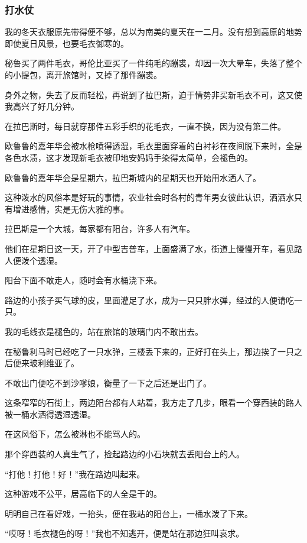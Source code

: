 \subsubsection*{打水仗}
\par 我的冬天衣服原先带得便不够，总以为南美的夏天在一二月。没有想到高原的地势即使夏日风景，也要毛衣御寒的。
\par 秘鲁买了两件毛衣，哥伦比亚买了一件纯毛的蹦裘，却因一次大晕车，失落了整个的小提包，离开旅馆时，又掉了那件蹦裘。
\par 身外之物，失去了反而轻松，再说到了拉巴斯，迫于情势非买新毛衣不可，这又使我高兴了好几分钟。
\par 在拉巴斯时，每日就穿那件五彩手织的花毛衣，一直不换，因为没有第二件。
\par 欧鲁鲁的嘉年华会被水枪喷得透湿，毛衣里面穿着的白衬衫在夜间脱下来时，全是各色水渍，这才发现新毛衣被印地安妈妈手染得太简单，会褪色的。
\par 欧鲁鲁的嘉年华会是星期六，拉巴斯城内的星期天也开始用水洒人了。
\par 这种泼水的风俗本是好玩的事情，农业社会时各村的青年男女彼此认识，洒洒水只有增进感情，实是无伤大雅的事。
\par 拉巴斯是一个大城，每家都有阳台，许多人有汽车。
\par 他们在星期日这一天，开了中型吉普车，上面盛满了水，街道上慢慢开车，看见路人便泼个透湿。
\par 阳台下面不敢走人，随时会有水桶浇下来。
\par 路边的小孩子买气球的皮，里面灌足了水，成为一只只胖水弹，经过的人便请吃一只。
\par 我的毛线衣是褪色的，站在旅馆的玻璃门内不敢出去。
\par 在秘鲁利马时已经吃了一只水弹，三楼丢下来的，正好打在头上，那边挨了一只之后便来玻利维亚了。
\par 不敢出门便吃不到沙嗲娘，衡量了一下之后还是出门了。
\par 这条窄窄的石街上，两边阳台都有人站着，我方走了几步，眼看一个穿西装的路人被一桶水洒得透湿透湿。
\par 在这风俗下，怎么被淋也不能骂人的。
\par 那个穿西装的人真生气了，捡起路边的小石块就去丢阳台上的人。
\par “打他！打他！好！”我在路边叫起来。
\par 这种游戏不公平，居高临下的人全是干的。
\par 明明自己在看好戏，一抬头，便在我站的阳台上，一桶水泼了下来。
\par “哎呀！毛衣褪色的呀！”我也不知逃开，便是站在那边狂叫哀求。
